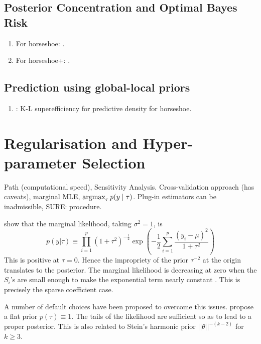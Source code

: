 \documentclass[11pt]{article}
\numberwithin{equation}{section}
\begin{document}
\subsection{Posterior Concentration and Optimal Bayes Risk}
\begin{enumerate}

\item For horseshoe: \citet{datta2013asymptotic}.

\item For horseshoe+: \citet{bhadra2015horseshoe+}.
\end{enumerate}

\subsection{Prediction using global-local priors}
\begin{enumerate}
\item \citet{ carvalho2010horseshoe}: K-L superefficiency for predictive density for horseshoe.


\end{enumerate}

\section{Regularisation and Hyper-parameter Selection}

Path (computational speed), Sensitivity Analysis. Cross-validation approach (has caveats), marginal MLE, $\argmax_{\tau} p(y \mid \tau)$. Plug-in estimators can be inadmissible, SURE: procedure. 


\citet{tiao65} show that the marginal likelihood, taking $ \sigma^2 = 1 $, is
$$
p( y |  \tau ) \equiv \prod_{i=1}^p ( 1 + \tau^2 )^{- \frac{1}{2}} \exp \left ( - \frac{1}{2} \sum_{i=1}^p
 \frac{ (y_i - \mu)^2 }{1 + \tau^2 } \right ) 
$$
This is positive at $ \tau = 0$. Hence the impropriety of the prior $ \tau^{-2} $ at
the origin translates to the posterior.  The marginal likelihood is decreasing at zero when the $S_i$'s are small
enough to make the exponential term nearly constant \citep{tiao65}. This is precisely the sparse coefficient case.

A number of default choices have been proposed to overcome this issues.
\citet{morris2011} propose a flat prior $ p( \tau ) \equiv 1 $. The tails of the likelihood are sufficient so as to
lead to a proper posterior. This is also related to Stein's harmonic prior 
$ || \theta ||^{-(k-2)} $ for $ k \geq 3 $.  
\end{document}
